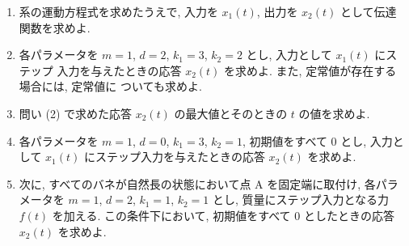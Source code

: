 \begin{enumerate}[label=(\arabic*)]
  \item 系の運動方程式を求めたうえで, 入力を $x_1(t)$, 出力を $x_2(t)$ として伝達関数を求めよ.

  \item 各パラメータを $m=1$, $d=2$, $k_1=3$, $k_2=2$ とし, 入力として $x_1(t)$ にステップ
        入力を与えたときの応答 $x_2(t)$ を求めよ. また, 定常値が存在する場合には, 定常値に
        ついても求めよ.

  \item 問い (2) で求めた応答 $x_2(t)$ の最大値とそのときの $t$ の値を求めよ.

  \item 各パラメータを $m=1$, $d=0$, $k_1=3$, $k_2=1$, 初期値をすべて $0$ とし, 入力として
        $x_1(t)$ にステップ入力を与えたときの応答 $x_2(t)$ を求めよ.

  \item 次に, すべてのバネが自然長の状態において点 A を固定端に取付け, 各パラメータを
        $m=1$, $d=2$, $k_1=1$, $k_2=1$ とし, 質量にステップ入力となる力 $f(t)$ を加える.
        この条件下において, 初期値をすべて $0$ としたときの応答 $x_2(t)$ を求めよ.
\end{enumerate}
